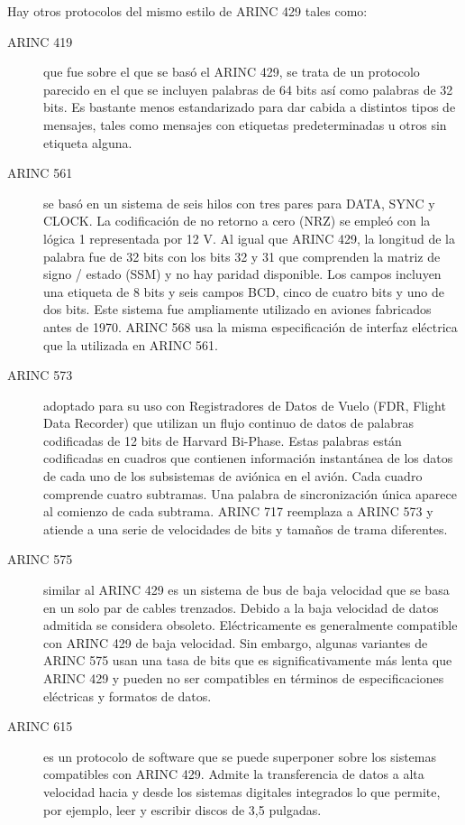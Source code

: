 Hay otros protocolos del mismo estilo de ARINC 429 tales como:

\begin{description}

\item [ARINC  419] que fue sobre el que se basó el ARINC 429,  se trata de un protocolo
parecido en el que se incluyen palabras de 64 bits así como palabras de 32 bits.
Es bastante menos estandarizado para dar cabida a distintos
tipos de mensajes, tales como mensajes con etiquetas predeterminadas u otros
sin etiqueta alguna. %

\item[ARINC 561] se basó en un sistema de seis hilos con tres pares  para DATA, SYNC y CLOCK. La codificación de no retorno a cero (NRZ) se empleó con la lógica 1 representada por 12 V. Al igual que ARINC 429, la longitud de la palabra fue de 32 bits con los bits 32 y 31 que comprenden la matriz de signo / estado (SSM) y no hay paridad disponible. Los campos incluyen una etiqueta de 8 bits y seis campos BCD, cinco de cuatro bits y uno de dos bits. Este sistema fue ampliamente utilizado en aviones fabricados antes de 1970. ARINC 568 usa la misma especificación de interfaz eléctrica que la utilizada en ARINC 561.

\item[ARINC 573] adoptado para su uso con Registradores de Datos de Vuelo (FDR, Flight Data Recorder) que utilizan un flujo continuo de datos de palabras codificadas de 12 bits de Harvard Bi-Phase. Estas palabras están codificadas en cuadros que contienen información instantánea de los datos de cada uno de los subsistemas de aviónica en el avión. Cada cuadro comprende cuatro subtramas. Una palabra de sincronización única aparece al comienzo de cada subtrama. ARINC 717 reemplaza a ARINC 573 y atiende a una serie de velocidades de bits y tamaños de trama diferentes.

\item[ARINC 575] similar al ARINC 429  es un sistema de bus de baja velocidad que se basa en un solo par de cables trenzados. Debido a la baja velocidad de datos admitida se considera obsoleto. Eléctricamente es generalmente compatible con ARINC 429 de baja velocidad. Sin embargo, algunas variantes de ARINC 575 usan una tasa de bits que es significativamente más lenta que ARINC 429 y pueden no ser compatibles en términos de especificaciones eléctricas y formatos de datos.

\item[ARINC 615] es un protocolo de software que se puede superponer sobre los sistemas compatibles con ARINC 429. Admite la transferencia de datos a alta velocidad hacia y desde los sistemas digitales integrados lo que permite, por ejemplo, leer y escribir discos de 3,5 pulgadas.


\end{description}
